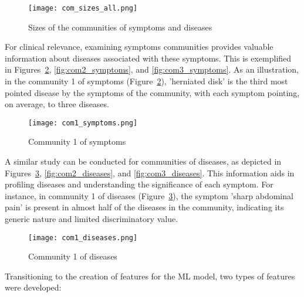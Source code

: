 \begin{figure}[H]
    \centering
    \texttt{[image: com\_sizes\_all.png]}
    \caption{Sizes of the communities of symptoms and diseases}
    \label{fig:com_sizes_all}
\end{figure}
\noindent
For clinical relevance, examining symptoms communities provides valuable information about diseases associated
with these symptoms. This is exemplified in Figures~\ref{fig:com1_symptoms}, \ref{fig:com2_symptoms},
and \ref{fig:com3_symptoms}. As an illustration, in the community 1 of symptoms (Figure~\ref{fig:com1_symptoms}),
'herniated disk' is the third most pointed disease by the symptoms of the community, with each symptom pointing,
on average, to three diseases.

\begin{figure}[H]
    \centering
    \texttt{[image: com1\_symptoms.png]}
    \caption{Community 1 of symptoms}
    \label{fig:com1_symptoms}
\end{figure}
\noindent
A similar study can be conducted for communities of diseases, as depicted in Figures~\ref{fig:com1_diseases},
\ref{fig:com2_diseases}, and \ref{fig:com3_diseases}. This information aids in profiling diseases and understanding
the significance of each symptom. For instance, in community 1 of diseases (Figure~\ref{fig:com1_diseases}),
the symptom 'sharp abdominal pain' is present in almost half of the diseases in the community, indicating its
generic nature and limited discriminatory value.

\begin{figure}[H]
    \centering
    \texttt{[image: com1\_diseases.png]}
    \caption{Community 1 of diseases}
    \label{fig:com1_diseases}
\end{figure}
\noindent
Transitioning to the creation of features for the ML model, two types of features were developed:\\

